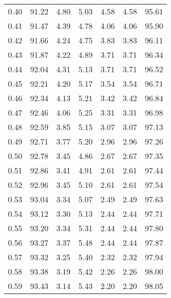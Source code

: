 \begin{tabular}{|c|c|c|c|c|c|c|}
      0.40 &     91.22 &      4.80 &       5.03 &    4.58 &       4.58 &         95.61 \\
      0.41 &     91.47 &      4.39 &       4.78 &    4.06 &       4.06 &         95.90 \\
      0.42 &     91.66 &      4.24 &       4.75 &    3.83 &       3.83 &         96.11 \\
      0.43 &     91.87 &      4.22 &       4.89 &    3.71 &       3.71 &         96.34 \\
      0.44 &     92.04 &      4.31 &       5.13 &    3.71 &       3.71 &         96.52 \\
      0.45 &     92.21 &      4.20 &       5.17 &    3.54 &       3.54 &         96.71 \\
      0.46 &     92.34 &      4.13 &       5.21 &    3.42 &       3.42 &         96.84 \\
      0.47 &     92.46 &      4.06 &       5.25 &    3.31 &       3.31 &         96.98 \\
      0.48 &     92.59 &      3.85 &       5.15 &    3.07 &       3.07 &         97.13 \\
      0.49 &     92.71 &      3.77 &       5.20 &    2.96 &       2.96 &         97.26 \\
      0.50 &     92.78 &      3.45 &       4.86 &    2.67 &       2.67 &         97.35 \\
      0.51 &     92.86 &      3.41 &       4.91 &    2.61 &       2.61 &         97.44 \\
      0.52 &     92.96 &      3.45 &       5.10 &    2.61 &       2.61 &         97.54 \\
      0.53 &     93.04 &      3.34 &       5.07 &    2.49 &       2.49 &         97.63 \\
      0.54 &     93.12 &      3.30 &       5.13 &    2.44 &       2.44 &         97.71 \\
      0.55 &     93.20 &      3.34 &       5.31 &    2.44 &       2.44 &         97.80 \\
      0.56 &     93.27 &      3.37 &       5.48 &    2.44 &       2.44 &         97.87 \\
      0.57 &     93.32 &      3.25 &       5.40 &    2.32 &       2.32 &         97.94 \\
      0.58 &     93.38 &      3.19 &       5.42 &    2.26 &       2.26 &         98.00 \\
      0.59 &     93.43 &      3.14 &       5.43 &    2.20 &       2.20 &         98.05 \\

\end{tabular}
